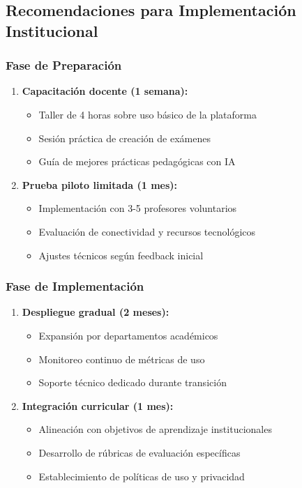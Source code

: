 \documentclass[12pt,a4paper]{report}
\begin{document}
\subsection{Recomendaciones para Implementación Institucional}

\subsubsection{Fase de Preparación}

\begin{enumerate}
\item \textbf{Capacitación docente (1 semana):}
   \begin{itemize}
   \item Taller de 4 horas sobre uso básico de la plataforma
   \item Sesión práctica de creación de exámenes
   \item Guía de mejores prácticas pedagógicas con IA
   \end{itemize}

\item \textbf{Prueba piloto limitada (1 mes):}
   \begin{itemize}
   \item Implementación con 3-5 profesores voluntarios
   \item Evaluación de conectividad y recursos tecnológicos
   \item Ajustes técnicos según feedback inicial
   \end{itemize}
\end{enumerate}

\subsubsection{Fase de Implementación}

\begin{enumerate}
\item \textbf{Despliegue gradual (2 meses):}
   \begin{itemize}
   \item Expansión por departamentos académicos
   \item Monitoreo continuo de métricas de uso
   \item Soporte técnico dedicado durante transición
   \end{itemize}

\item \textbf{Integración curricular (1 mes):}
   \begin{itemize}
   \item Alineación con objetivos de aprendizaje institucionales
   \item Desarrollo de rúbricas de evaluación específicas
   \item Establecimiento de políticas de uso y privacidad
   \end{itemize}
\end{enumerate}
\end{document}
